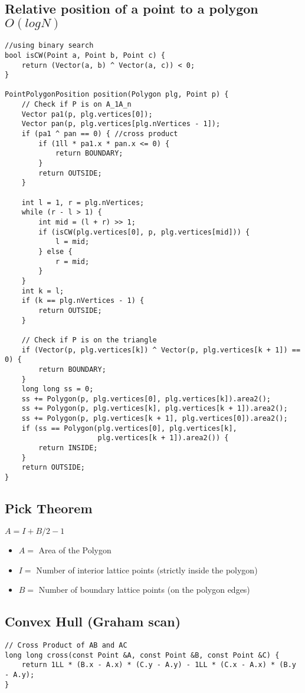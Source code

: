 \documentclass[11pt,a4paper]{article}
\begin{document}
\begin{multicols*}{2}
\subsection{Relative position of a point to a polygon $O(logN)$}
\begin{lstlisting}
//using binary search
bool isCW(Point a, Point b, Point c) {
    return (Vector(a, b) ^ Vector(a, c)) < 0;
}

PointPolygonPosition position(Polygon plg, Point p) {
    // Check if P is on A_1A_n 
    Vector pa1(p, plg.vertices[0]);
    Vector pan(p, plg.vertices[plg.nVertices - 1]);
    if (pa1 ^ pan == 0) { //cross product
        if (1ll * pa1.x * pan.x <= 0) {
            return BOUNDARY;
        }
        return OUTSIDE;
    }

    int l = 1, r = plg.nVertices;
    while (r - l > 1) {
        int mid = (l + r) >> 1;
        if (isCW(plg.vertices[0], p, plg.vertices[mid])) {
            l = mid;
        } else {
            r = mid;
        }
    }
    int k = l;
    if (k == plg.nVertices - 1) {
        return OUTSIDE;
    }

    // Check if P is on the triangle
    if (Vector(p, plg.vertices[k]) ^ Vector(p, plg.vertices[k + 1]) == 0) {
        return BOUNDARY;
    }
    long long ss = 0;
    ss += Polygon(p, plg.vertices[0], plg.vertices[k]).area2();
    ss += Polygon(p, plg.vertices[k], plg.vertices[k + 1]).area2();
    ss += Polygon(p, plg.vertices[k + 1], plg.vertices[0]).area2();
    if (ss == Polygon(plg.vertices[0], plg.vertices[k],
                      plg.vertices[k + 1]).area2()) {
        return INSIDE;
    }
    return OUTSIDE;
}
\end{lstlisting}

\subsection{Pick Theorem}
$A = I + B/2 - 1$
\begin{itemize}
    \item $A = $ Area of the Polygon
    \item $I = $ Number of interior lattice points (strictly inside the polygon)
    \item $B = $ Number of boundary lattice points (on the polygon edges) 
\end{itemize}

\subsection{Convex Hull (Graham scan)}
\begin{lstlisting}
// Cross Product of AB and AC
long long cross(const Point &A, const Point &B, const Point &C) {
    return 1LL * (B.x - A.x) * (C.y - A.y) - 1LL * (C.x - A.x) * (B.y - A.y);
}


\end{lstlisting}
\end{multicols*}
\end{document}
